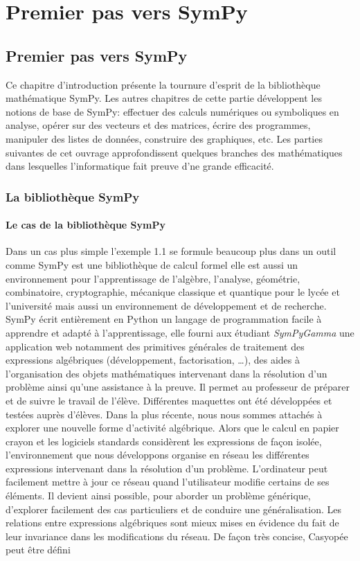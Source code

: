 \part{Premier pas vers SymPy}
\chapter{Premier pas vers SymPy}

Ce chapitre d’introduction présente la tournure d'esprit de la bibliothèque mathématique SymPy. Les 
autres chapitres de cette partie développent les notions de base de SymPy: effectuer des calculs 
numériques ou symboliques en analyse, opérer sur des vecteurs et des matrices, écrire des programmes, 
manipuler des listes de données, construire des graphiques, etc. Les parties suivantes de cet ouvrage 
approfondissent quelques branches des mathématiques dans lesquelles l'informatique fait preuve d'ne 
grande efficacité.

\section{La bibliothèque SymPy}

\subsection{Le cas de la bibliothèque SymPy}

Dans un cas plus simple l'exemple 1.1 se formule beaucoup plus dans un outil comme SymPy est une bibliothèque de calcul formel elle est aussi un environnement pour 
l’apprentissage de l'algèbre, l’analyse, géométrie, combinatoire, cryptographie, mécanique 
classique et quantique pour le lycée et l’université mais aussi un environnement de 
développement et de recherche. SymPy  écrit entièrement en Python un langage de 
programmation facile à apprendre et adapté à l’apprentissage,  elle fourni aux étudiant 
\textit{SymPyGamma} une application web   notamment des primitives générales de traitement des 
expressions algébriques (développement, factorisation, …), des aides à l’organisation des objets 
mathématiques intervenant dans la résolution d’un problème ainsi qu’une assistance à la preuve. Il 
permet au professeur de préparer et de suivre le travail de l’élève. Différentes maquettes ont été 
développées et testées auprès d’élèves. Dans la plus récente, nous nous sommes attachés à explorer une 
nouvelle forme d’activité algébrique. Alors que le calcul en papier crayon et les logiciels standards 
considèrent  les expressions de façon isolée, l’environnement que nous développons organise en réseau 
les différentes expressions intervenant dans la résolution d’un problème. L’ordinateur peut facilement 
mettre à jour ce réseau quand l’utilisateur modifie certains de ses éléments. Il devient ainsi possible, 
pour aborder un problème générique, d’explorer facilement des cas particuliers et de conduire une 
généralisation. Les relations entre expressions algébriques sont mieux mises en évidence du fait de leur 
invariance dans les modifications du réseau. De façon très concise, Casyopée peut être défini
